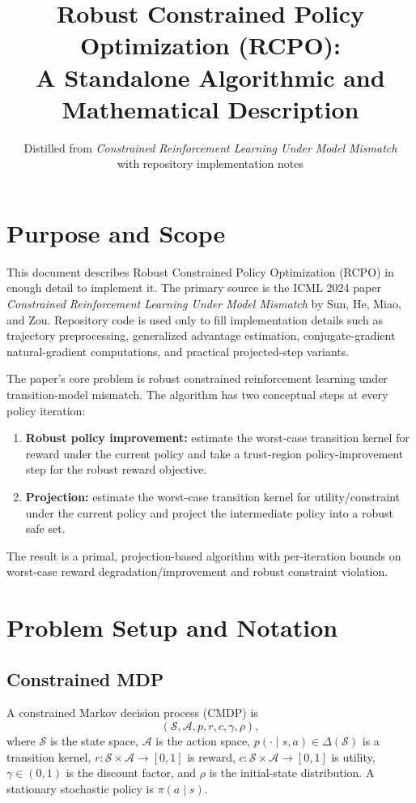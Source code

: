 \documentclass[11pt]{article}
\title{Robust Constrained Policy Optimization (RCPO):\\
A Standalone Algorithmic and Mathematical Description}
\author{Distilled from \emph{Constrained Reinforcement Learning Under Model Mismatch}\\
with repository implementation notes}
\date{}
\newcommand{\Sset}{\mathcal S}
\newcommand{\Aset}{\mathcal A}
\begin{document}
\maketitle

\section{Purpose and Scope}
This document describes Robust Constrained Policy Optimization (RCPO) in enough detail to implement it.  The primary source is the ICML 2024 paper \emph{Constrained Reinforcement Learning Under Model Mismatch} by Sun, He, Miao, and Zou.  Repository code is used only to fill implementation details such as trajectory preprocessing, generalized advantage estimation, conjugate-gradient natural-gradient computations, and practical projected-step variants.

The paper's core problem is robust constrained reinforcement learning under transition-model mismatch.  The algorithm has two conceptual steps at every policy iteration:
\begin{enumerate}[leftmargin=2em]
    \item \textbf{Robust policy improvement:} estimate the worst-case transition kernel for reward under the current policy and take a trust-region policy-improvement step for the robust reward objective.
    \item \textbf{Projection:} estimate the worst-case transition kernel for utility/constraint under the current policy and project the intermediate policy into a robust safe set.
\end{enumerate}
The result is a primal, projection-based algorithm with per-iteration bounds on worst-case reward degradation/improvement and robust constraint violation.

\section{Problem Setup and Notation}
\subsection{Constrained MDP}
A constrained Markov decision process (CMDP) is
\[
    (\Sset,\Aset,p,r,c,\gamma,\rho),
\]
where $\Sset$ is the state space, $\Aset$ is the action space, $p(\cdot\mid s,a)\in\Delta(\Sset)$ is a transition kernel, $r:\Sset\times\Aset\to[0,1]$ is reward, $c:\Sset\times\Aset\to[0,1]$ is utility, $\gamma\in(0,1)$ is the discount factor, and $\rho$ is the initial-state distribution.  A stationary stochastic policy is $\pi(a\mid s)$.
\end{document}
